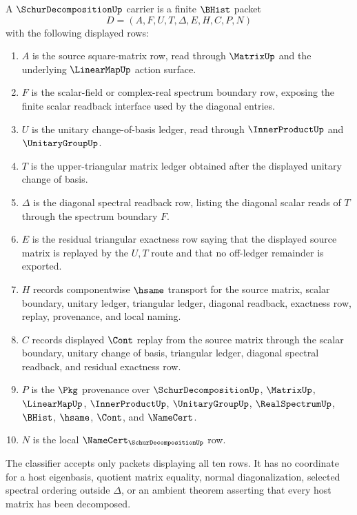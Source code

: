 \begin{definition}
\label{def:schur-decomposition-carrier}
A $\SchurDecompositionUp$ carrier is a finite $\BHist$ packet
$$
D=(A,F,U,T,\Delta,E,H,C,P,N)
$$
with the following displayed rows:
\begin{enumerate}
\item $A$ is the source square-matrix row, read through $\MatrixUp$ and the underlying $\LinearMapUp$ action surface.
\item $F$ is the scalar-field or complex-real spectrum boundary row, exposing the finite scalar readback interface used by the diagonal entries.
\item $U$ is the unitary change-of-basis ledger, read through $\InnerProductUp$ and $\UnitaryGroupUp$.
\item $T$ is the upper-triangular matrix ledger obtained after the displayed unitary change of basis.
\item $\Delta$ is the diagonal spectral readback row, listing the diagonal scalar reads of $T$ through the spectrum boundary $F$.
\item $E$ is the residual triangular exactness row saying that the displayed source matrix is replayed by the $U,T$ route and that no off-ledger remainder is exported.
\item $H$ records componentwise $\hsame$ transport for the source matrix, scalar boundary, unitary ledger, triangular ledger, diagonal readback, exactness row, replay, provenance, and local naming.
\item $C$ records displayed $\Cont$ replay from the source matrix through the scalar boundary, unitary change of basis, triangular ledger, diagonal spectral readback, and residual exactness row.
\item $P$ is the $\Pkg$ provenance over $\SchurDecompositionUp$, $\MatrixUp$, $\LinearMapUp$, $\InnerProductUp$, $\UnitaryGroupUp$, $\RealSpectrumUp$, $\BHist$, $\hsame$, $\Cont$, and $\NameCert$.
\item $N$ is the local $\NameCert_{\SchurDecompositionUp}$ row.
\end{enumerate}
The classifier accepts only packets displaying all ten rows. It has no coordinate for a host eigenbasis, quotient matrix equality, normal diagonalization, selected spectral ordering outside $\Delta$, or an ambient theorem asserting that every host matrix has been decomposed.
\end{definition}

